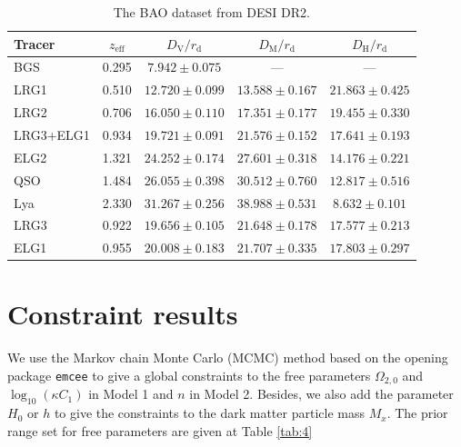 \documentclass[twocolumn]{aastex631}
\begin{document}
   \begin{table}[htbp]
      \centering
      \begin{tabular}{lcccc}
         \hline\hline
         Tracer & $z_{\text{eff}}$ & $D_{\text{V}}/r_{\text{d}}$ & 
         $D_{\text{M}}/r_{\text{d}}$ & $D_{\text{H}}/r_{\text{d}}$ \\
         \hline
         BGS & 0.295 & $7.942 \pm 0.075$  & --- & --- \\
         LRG1 & 0.510 & $12.720 \pm 0.099$ & $13.588 \pm 0.167$ & $21.863 \pm 0.425$ \\
         LRG2 & 0.706 & $16.050 \pm 0.110$ & $17.351 \pm 0.177$ & $19.455 \pm 0.330$ \\
         LRG3+ELG1 & 0.934 & $19.721 \pm 0.091$ & $21.576 \pm 0.152$ & $17.641 \pm 0.193$ \\
         ELG2 & 1.321 & $24.252 \pm 0.174$ & $27.601 \pm 0.318$ & $14.176 \pm 0.221$ \\
         QSO & 1.484 & $26.055 \pm 0.398$ & $30.512 \pm 0.760$ & $12.817 \pm 0.516$ \\
         Lya & 2.330 & $31.267 \pm 0.256$ & $38.988 \pm 0.531$ & $8.632 \pm 0.101$ \\
         \hline
         LRG3 & 0.922 & $19.656 \pm 0.105$ & $21.648 \pm 0.178$ & $17.577 \pm 0.213$ \\
         ELG1 & 0.955 & $20.008 \pm 0.183$ & $21.707 \pm 0.335$ & $17.803 \pm 0.297$ \\    
         \hline
      \end{tabular}
      \caption{The BAO dataset from DESI DR2.}
      \label{tab:3}
   \end{table}

\section{Constraint results}

   We use the Markov chain Monte Carlo (MCMC) method based 
   on the opening package \texttt{emcee} to give a global constraints
   to the free parameters $\Omega_{2,0}$ and $\log_{10}(\kappa C_1)$ in 
   Model 1 and $n$ in Model 2.
   Besides, we also add the parameter $H_0$ or $h$ to give the constraints
   to the dark matter particle mass $M_x$.
   The prior range set for free parameters are given at Table \ref{tab:4}
\end{document}
